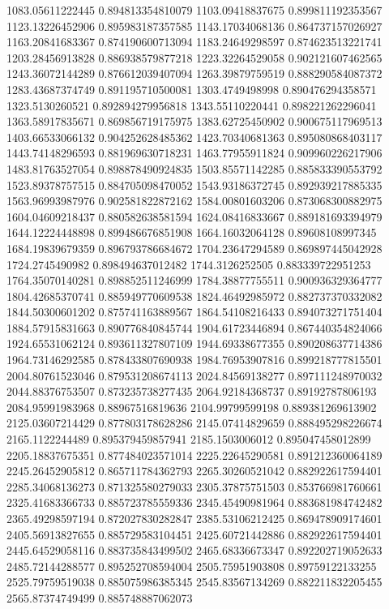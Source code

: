 {1083.05611222445 0.894813354810079
1103.09418837675 0.899811192353567
1123.13226452906 0.895983187357585
1143.17034068136 0.864737157026927
1163.20841683367 0.874190600713094
1183.24649298597 0.874623513221741
1203.28456913828 0.886938579877218
1223.32264529058 0.902121607462565
1243.36072144289 0.876612039407094
1263.39879759519 0.888290584087372
1283.43687374749 0.891195710500081
1303.4749498998 0.890476294358571
1323.5130260521 0.892894279956818
1343.55110220441 0.898221262296041
1363.58917835671 0.869856719175975
1383.62725450902 0.900675117969513
1403.66533066132 0.904252628485362
1423.70340681363 0.895080868403117
1443.74148296593 0.881969630718231
1463.77955911824 0.909960226217906
1483.81763527054 0.898878490924835
1503.85571142285 0.885833390553792
1523.89378757515 0.884705098470052
1543.93186372745 0.892939217885335
1563.96993987976 0.902581822872162
1584.00801603206 0.873068300882975
1604.04609218437 0.880582638581594
1624.08416833667 0.889181693394979
1644.12224448898 0.899486676851908
1664.16032064128 0.89608108997345
1684.19839679359 0.896793786684672
1704.23647294589 0.869897445042928
1724.2745490982 0.898494637012482
1744.3126252505 0.883339722951253
1764.35070140281 0.898852511246999
1784.38877755511 0.900936329364777
1804.42685370741 0.885949770609538
1824.46492985972 0.882737370332082
1844.50300601202 0.875741163889567
1864.54108216433 0.894073271751404
1884.57915831663 0.890776840845744
1904.61723446894 0.867440354824066
1924.65531062124 0.893611327807109
1944.69338677355 0.890208637714386
1964.73146292585 0.878433807690938
1984.76953907816 0.899218777815501
2004.80761523046 0.879531208674113
2024.84569138277 0.897111248970032
2044.88376753507 0.873235738277435
2064.92184368737 0.89192787806193
2084.95991983968 0.88967516819636
2104.99799599198 0.889381269613902
2125.03607214429 0.877803178628286
2145.07414829659 0.888495298226674
2165.1122244489 0.895379459857941
2185.1503006012 0.895047458012899
2205.18837675351 0.877484023571014
2225.22645290581 0.891212360064189
2245.26452905812 0.865711784362793
2265.30260521042 0.882922617594401
2285.34068136273 0.871325580279033
2305.37875751503 0.853766981760661
2325.41683366733 0.885723785559336
2345.45490981964 0.883681984742482
2365.49298597194 0.872027830282847
2385.53106212425 0.869478909174601
2405.56913827655 0.885729583104451
2425.60721442886 0.882922617594401
2445.64529058116 0.883735843499502
2465.68336673347 0.892202719052633
2485.72144288577 0.895252708594004
2505.75951903808 0.89759122133255
2525.79759519038 0.885075986385345
2545.83567134269 0.882211832205455
2565.87374749499 0.885748887062073
}
